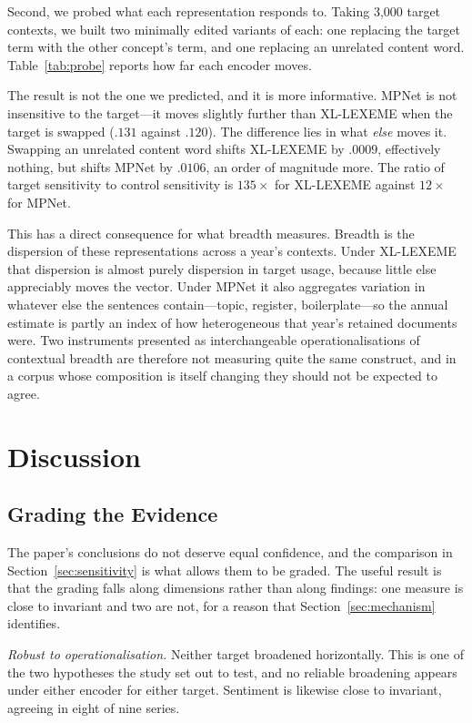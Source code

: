 \documentclass[final]{clv2025}
\begin{document}
Second, we probed what each representation responds to. Taking 3{,}000 target contexts, we
built two minimally edited variants of each: one replacing the target term with the other
concept's term, and one replacing an unrelated content word. Table~\ref{tab:probe} reports
how far each encoder moves.



The result is not the one we predicted, and it is more informative. MPNet is not
insensitive to the target---it moves slightly further than XL-LEXEME when the target is
swapped ($.131$ against $.120$). The difference lies in what \emph{else} moves it. Swapping
an unrelated content word shifts XL-LEXEME by $.0009$, effectively nothing, but shifts
MPNet by $.0106$, an order of magnitude more. The ratio of target sensitivity to control
sensitivity is $135\times$ for XL-LEXEME against $12\times$ for MPNet.

This has a direct consequence for what breadth measures. Breadth is the dispersion of these
representations across a year's contexts. Under XL-LEXEME that dispersion is almost purely
dispersion in target usage, because little else appreciably moves the vector. Under MPNet it
also aggregates variation in whatever else the sentences contain---topic, register,
boilerplate---so the annual estimate is partly an index of how heterogeneous that year's
retained documents were. Two instruments presented as interchangeable operationalisations of
contextual breadth are therefore not measuring quite the same construct, and in a corpus
whose composition is itself changing they should not be expected to agree.

\section{Discussion}

\subsection{Grading the Evidence}

The paper's conclusions do not deserve equal confidence, and the comparison in
Section~\ref{sec:sensitivity} is what allows them to be graded. The useful result is that
the grading falls along dimensions rather than along findings: one measure is close to
invariant and two are not, for a reason that Section~\ref{sec:mechanism} identifies.

\emph{Robust to operationalisation.} Neither target broadened horizontally. This is one of
the two hypotheses the study set out to test, and no reliable broadening appears under
either encoder for either target. Sentiment is likewise close to invariant, agreeing in
eight of nine series.
\end{document}
